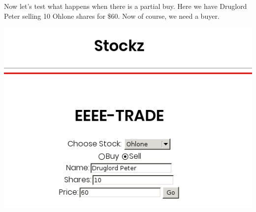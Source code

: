 Now let's test what happens when there is a partial buy. Here we have Druglord Peter selling 10 Ohlone shares for \$60. Now of course, we need a buyer.

 
\includegraphics[scale=0.5]{../test8.png}
 